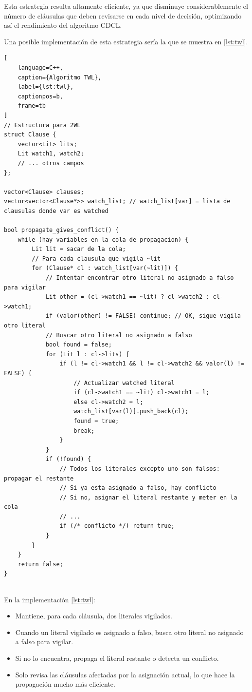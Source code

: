 Esta estrategia resulta altamente eficiente, ya que disminuye considerablemente el n\'umero de cl\'ausulas que deben revisarse en cada nivel de decisi\'on, optimizando as\'i el rendimiento del algoritmo CDCL.

Una posible implementaci\'on de esta estrategia ser\'ia la que se muestra en \ref{lst:twl}.

\begin{lstlisting}[
    language=C++,
    caption={Algoritmo TWL},
    label={lst:twl},
    captionpos=b,
    frame=tb
]
// Estructura para 2WL
struct Clause {
    vector<Lit> lits;
    Lit watch1, watch2;
    // ... otros campos
};

vector<Clause> clauses;
vector<vector<Clause*>> watch_list; // watch_list[var] = lista de clausulas donde var es watched

bool propagate_gives_conflict() {
    while (hay variables en la cola de propagacion) {
        Lit lit = sacar de la cola;
        // Para cada clausula que vigila ~lit
        for (Clause* cl : watch_list[var(~lit)]) {
            // Intentar encontrar otro literal no asignado a falso para vigilar
            Lit other = (cl->watch1 == ~lit) ? cl->watch2 : cl->watch1;
            if (valor(other) != FALSE) continue; // OK, sigue vigila otro literal
            // Buscar otro literal no asignado a falso
            bool found = false;
            for (Lit l : cl->lits) {
                if (l != cl->watch1 && l != cl->watch2 && valor(l) != FALSE) {
                    // Actualizar watched literal
                    if (cl->watch1 == ~lit) cl->watch1 = l;
                    else cl->watch2 = l;
                    watch_list[var(l)].push_back(cl);
                    found = true;
                    break;
                }
            }
            if (!found) {
                // Todos los literales excepto uno son falsos: propagar el restante
                // Si ya esta asignado a falso, hay conflicto
                // Si no, asignar el literal restante y meter en la cola
                // ...
                if (/* conflicto */) return true;
            }
        }
    }
    return false;
}


\end{lstlisting}

En la implementaci\'on \ref{lst:twl}:
\begin{itemize}
    \item Mantiene, para cada cláusula, dos literales vigilados.
    \item Cuando un literal vigilado es asignado a falso, busca otro literal no asignado a falso para vigilar.
    \item Si no lo encuentra, propaga el literal restante o detecta un conflicto.
    \item Solo revisa las cláusulas afectadas por la asignación actual, lo que hace la propagación mucho más eficiente.
\end{itemize}

